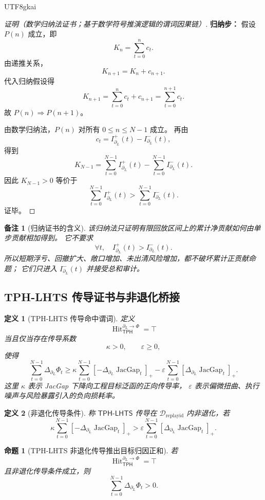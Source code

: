 \documentclass[12pt]{article}
\newtheorem{definition}{定义}[section]
\newtheorem{proposition}{命题}[section]
\newtheorem{remark}{备注}[section]
\newcommand{\TPH}{\ensuremath{\mathsf{TPH}}}
\newcommand{\TPHLHTS}{\ensuremath{\mathsf{TPH\mbox{-}LHTS}}}
\DeclareMathOperator{\Hit}{Hit}
\DeclareMathOperator{\JacGap}{JacGap}
\begin{document}
\begin{CJK*}{UTF8}{gkai}
\begin{proof}[证明（数学归纳法证书；基于数学符号推演逻辑的谓词因果链）]
\textbf{归纳步：}
假设 \(P(n)\) 成立，即
\[
  K_n=\sum_{t=0}^{n}c_t.
\]
由递推关系，
\[
  K_{n+1}=K_n+c_{n+1}.
\]
代入归纳假设得
\[
  K_{n+1}
  =
  \sum_{t=0}^{n}c_t+c_{n+1}
  =
  \sum_{t=0}^{n+1}c_t.
\]
故 \(P(n)\Rightarrow P(n+1)\)。

由数学归纳法，\(P(n)\) 对所有 \(0\le n\le N-1\) 成立。
再由
\[
  c_t=I^+_{\partial_L}(t)-I^-_{\partial_L}(t),
\]
得到
\[
  K_{N-1}
  =
  \sum_{t=0}^{N-1}I^+_{\partial_L}(t)
  -
  \sum_{t=0}^{N-1}I^-_{\partial_L}(t).
\]
因此 \(K_{N-1}>0\) 等价于
\[
  \sum_{t=0}^{N-1}I^+_{\partial_L}(t)
  >
  \sum_{t=0}^{N-1}I^-_{\partial_L}(t).
\]
证毕。
\end{proof}

\begin{remark}[归纳证书的含义]
该归纳法只证明有限回放区间上的累计净贡献如何由单步贡献相加得到。
它不要求
\[
  \forall t,\quad I^+_{\partial_L}(t)>I^-_{\partial_L}(t).
\]
所以短期浮亏、回撤扩大、敞口增加、未出清风险增加，都不破坏累计正贡献命题；
它们只进入 \(I^-_{\partial_L}(t)\) 并接受总和审计。
\end{remark}

\subsection{TPH-LHTS 传导证书与非退化桥接}
\label{subsec:tex58-tph-lhts-bridge}

\begin{definition}[TPH-LHTS 传导命中谓词]
\label{def:tex58-tph-bridge-hit}
定义
\[
  \Hit_{\TPH}^{\partial_L\to\Phi}=\top
\]
当且仅当存在传导系数
\[
  \kappa>0,
  \qquad
  \varepsilon\ge0,
\]
使得
\[
  \sum_{t=0}^{N-1}\Delta_{\partial_L}\Phi_t
  \ge
  \kappa
  \sum_{t=0}^{N-1}[-\Delta_{\partial_L}\JacGap_t]_+
  -
  \varepsilon
  \sum_{t=0}^{N-1}[\Delta_{\partial_L}\JacGap_t]_+.
\]
这里 \(\kappa\) 表示 JacGap 下降向工程目标泛函的正向传导率，
\(\varepsilon\) 表示偏微扭曲、执行噪声与风险暴露引入的负向损耗率。
\end{definition}

\begin{definition}[非退化传导条件]
\label{def:tex58-nondegenerate-bridge}
称 \(\TPHLHTS{}\) 传导在 \(\mathcal D_{\mathrm{replayid}}\) 内非退化，若
\[
  \kappa
  \sum_{t=0}^{N-1}[-\Delta_{\partial_L}\JacGap_t]_+
  >
  \varepsilon
  \sum_{t=0}^{N-1}[\Delta_{\partial_L}\JacGap_t]_+.
\]
\end{definition}

\begin{proposition}[TPH-LHTS 非退化传导推出目标归因正和]
\label{prop:tex58-bridge-positive-attribution}
若
\[
  \Hit_{\TPH}^{\partial_L\to\Phi}=\top
\]
且非退化传导条件成立，则
\[
  \sum_{t=0}^{N-1}\Delta_{\partial_L}\Phi_t>0.
\]
\end{proposition}


\end{CJK*}
\end{document}
